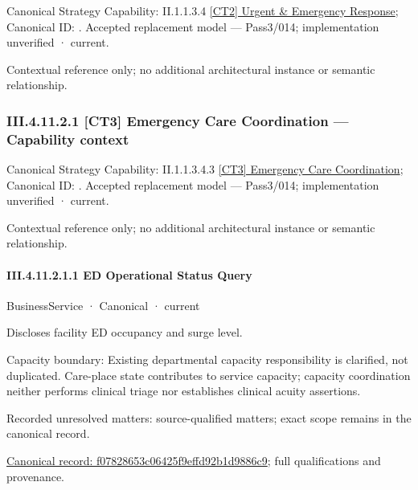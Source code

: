 {\small Canonical Strategy Capability: II.1.1.3.4 \hyperref[element:d6c40bcfc84a4b758530edcaabfbd0ca]{[CT2] Urgent \& Emergency Response}; Canonical ID: \texttt{}. Accepted replacement model — Pass3/014; implementation unverified · current.}\par
Contextual reference only; no additional architectural instance or semantic relationship.\par
\subsubsection*{III.4.11.2.1 [CT3] Emergency Care Coordination — Capability context}
\label{navigation:III.4.11.2.1}

{\small Canonical Strategy Capability: II.1.1.3.4.3 \hyperref[element:22cb7ae4bd6b4c73aa2d8f5210eee460]{[CT3] Emergency Care Coordination}; Canonical ID: \texttt{}. Accepted replacement model — Pass3/014; implementation unverified · current.}\par
Contextual reference only; no additional architectural instance or semantic relationship.\par
\paragraph*{III.4.11.2.1.1 ED Operational Status Query}
\label{navigation:III.4.11.2.1.1}

\label{element:f07828653c06425f9effd92b1d9886c9}
{\small BusinessService · Canonical · current}\par

Discloses facility ED occupancy and surge level.



Capacity boundary: Existing departmental capacity responsibility is clarified, not duplicated. Care-place state contributes to service capacity; capacity coordination neither performs clinical triage nor establishes clinical acuity assertions.


{\small Recorded unresolved matters: source-qualified matters; exact scope remains in the canonical record.}\par
{\footnotesize \href{../../../../../../../../continuum/business/business-service/f07828653c06425f9effd92b1d9886c9.md}{Canonical record: f07828653c06425f9effd92b1d9886c9}; full qualifications and provenance.}\par
